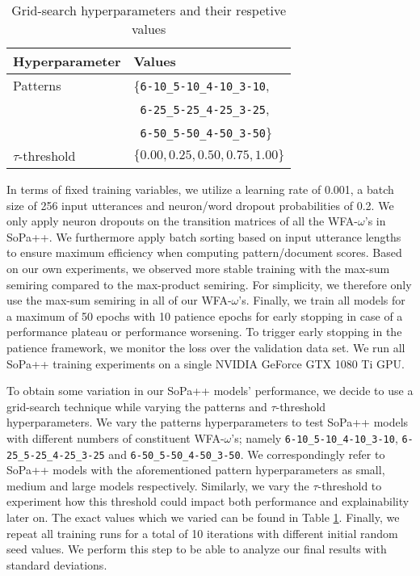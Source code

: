 \begin{table}[t!]
  \centering
  \begin{tabular}{ll}
    \toprule
    Hyperparameter & Values \\
    \midrule
    Patterns & \{\texttt{6-10\_5-10\_4-10\_3-10}, \\
             & ~\texttt{6-25\_5-25\_4-25\_3-25}, \\
             & ~\texttt{6-50\_5-50\_4-50\_3-50}\} \\[10pt]
    $\tau$-threshold & $\{0.00, 0.25, 0.50, 0.75, 1.00\}$ \\
    \bottomrule
  \end{tabular}
  \caption{Grid-search hyperparameters and their respetive values}
  \label{tab:grid_hyperparameter}
\end{table}

In terms of fixed training variables, we utilize a learning rate of 0.001, a
batch size of 256 input utterances and neuron/word dropout probabilities of 0.2.
We only apply neuron dropouts on the transition matrices of all the
WFA-$\omega$'s in SoPa++. We furthermore apply batch sorting based on input
utterance lengths to ensure maximum efficiency when computing pattern/document
scores. Based on our own experiments, we observed more stable
training with the max-sum semiring compared to the max-product semiring. For
simplicity, we therefore only use the max-sum semiring in all of our
WFA-$\omega$'s. Finally, we train all models for a maximum of 50 epochs with 10
patience epochs for early stopping in case of a performance plateau or
performance worsening. To trigger early stopping in the patience framework, we
monitor the loss over the validation data set. We run all SoPa++ training
experiments on a single NVIDIA GeForce GTX 1080 Ti GPU. 

To obtain some variation in our SoPa++ models' performance, we decide to use a
grid-search technique while varying the patterns and $\tau$-threshold
hyperparameters. We vary the patterns hyperparameters to test SoPa++ models with
different numbers of constituent WFA-$\omega$'s; namely
\texttt{6-10\_5-10\_4-10\_3-10}, \texttt{6-25\_5-25\_4-25\_3-25} and
\texttt{6-50\_5-50\_4-50\_3-50}. We correspondingly refer to SoPa++ models with
the aforementioned pattern hyperparameters as small, medium and large models
respectively. Similarly, we vary the $\tau$-threshold to experiment how this
threshold could impact both performance and explainability later on. The exact
values which we varied can be found in Table \ref{tab:grid_hyperparameter}.
Finally, we repeat all training runs for a total of 10 iterations with different
initial random seed values. We perform this step to be able to analyze our final
results with standard deviations.

